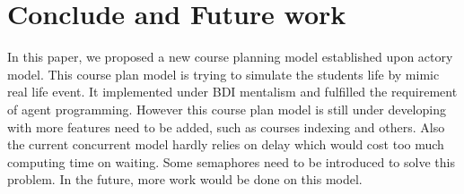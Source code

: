 \documentclass{sig-alternate}
\begin{document}
\section{Conclude and Future work}
In this paper, we proposed a new course planning model established upon actory model.  This course plan model is trying to simulate the students life by mimic real life event.  It implemented under BDI mentalism and fulfilled the requirement of agent programming. However 
this course plan model is still under developing with more features need to be added, such as courses indexing and others.   Also the current concurrent model hardly relies on delay which would cost too much computing time on waiting. Some semaphores need to be introduced to solve this problem.  In the future, more work would be done on this model.  



\end{document}
